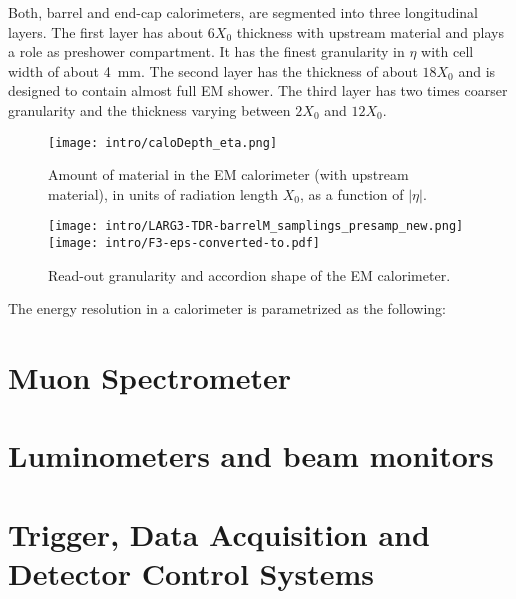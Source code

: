 Both, barrel and end-cap calorimeters, are segmented into three longitudinal layers. The first layer has about $6 X_0$ thickness with upstream material and plays a role as preshower compartment. It has the finest granularity in $\eta$ with cell width of about 4~mm. The second layer has the thickness of about $18 X_0$ and is designed to contain almost full EM shower. The third layer has two times coarser granularity and the thickness varying between $2 X_0$ and $12 X_0$.

\begin{figure}[h!]
\centering
\texttt{[image: intro/caloDepth\_eta.png]}
\caption{Amount of material in the EM calorimeter (with upstream material), in units of radiation length $X_0$, as a function of $|\eta|$.}
\label{fig:Calo}
\end{figure}

\begin{figure}[h!]
\centering
\texttt{[image: intro/LARG3-TDR-barrelM\_samplings\_presamp\_new.png]}
\texttt{[image: intro/F3-eps-converted-to.pdf]}
\caption{Read-out granularity and accordion shape of the EM calorimeter.}
\label{fig:EMgran}
\end{figure}


The energy resolution in a calorimeter is parametrized as the following: 

\section{Muon Spectrometer}
\section{Luminometers and beam monitors}
\section{Trigger, Data Acquisition and Detector Control Systems}

